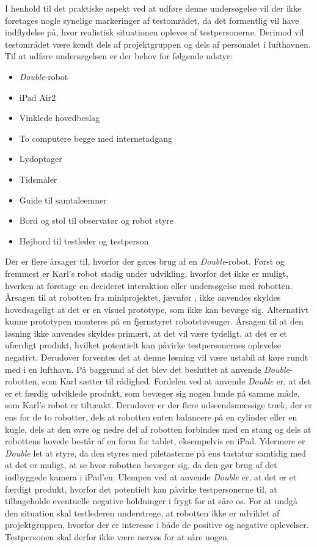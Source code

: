 I henhold til det praktiske aspekt ved at udføre denne undersøgelse vil der ikke foretages nogle synelige markeringer af testområdet, da det formentlig vil have indflydelse på, hvor realistisk situationen opleves af testpersonerne. Derimod vil testområdet være kendt dels af projektgruppen og dels af personalet i lufthavnen. \blankline
%
Til at udføre undersøgelsen er der behov for følgende udstyr:\blankline
%
\begin{itemize}
  \item \textit{Double}-robot
  \item iPad Air2
  \item Vinklede hovedbeslag
  \item To computere begge med internetadgang
  \item Lydoptager
  \item Tidsmåler
  \item Guide til samtaleemner
  \item Bord og stol til observatør og robot styre
  \item Højbord til testleder og testperson\blankline
\end{itemize}
\noindent
%
Der er flere årsager til, hvorfor der gøres brug af en \textit{Double}-robot. Først og fremmest er Karl's robot stadig under udvikling, hvorfor det ikke er muligt, hverken at foretage en decideret interaktion eller undersøgelse med robotten. Årsagen til at robotten fra miniprojektet, jævnfør \fullref{\MiniprojektHovedeVinkelpartname}, ikke anvendes skyldes hovedsageligt at det er en visuel prototype, som ikke kan bevæge sig. Alternativt kunne prototypen monteres på en fjernstyret robotstøvsuger. Årsagen til at den løsning ikke anvendes skyldes primært, at det vil være tydeligt, at det er et ufærdigt produkt, hvilket potentielt kan påvirke testpersonernes oplevelse negativt. Derudover forventes det at denne løsning vil være ustabil at køre rundt med i en lufthavn. På baggrund af det blev det besluttet at anvende \textit{Double}-robotten, som Karl sætter til rådighed. Fordelen ved at anvende \textit{Double} er, at det er et færdig udviklede produkt, som bevæger sig nogen lunde på samme måde, som Karl's robot er tiltænkt. Derudover er der flere udseendsmæssige træk, der er ens for de to robotter, dels at robotten enten balancere på en cylinder eller en kugle, dels at den øvre og nedre del af robotten forbindes med en stang og dels at robottens hovede består af en form for tablet, eksempelvis en iPad. Ydermere er \textit{Double} let at styre, da den styres med piletasterne på ens tastatur samtidig med at det er muligt, at se hvor robotten bevæger sig, da den gør brug af det indbyggede kamera i iPad'en. Ulempen ved at anvende \textit{Double} er, at det er et færdigt produkt, hvorfor det potentielt kan påvirke testpersonerne til, at tilbageholde eventuelle negative holdninger i frygt for at såre os. For at undgå den situation skal testlederen understrege, at robotten ikke er udviklet af projektgruppen, hvorfor der er interesse i både de positive og negative oplevelser. Testpersonen skal derfor ikke være nervøs for at såre nogen. \blankline
